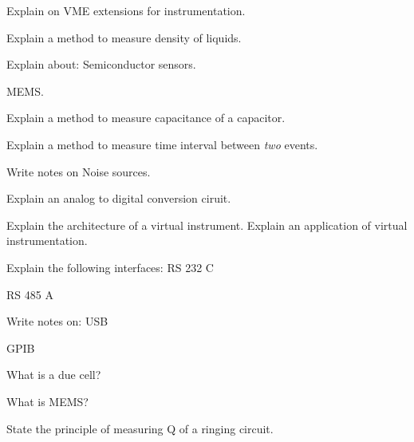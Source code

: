\item Explain on VME extensions for instrumentation.

\markB

\partC

\item \iitem Explain a method to measure density of liquids.

\Or

\item Explain about:
  \iitem Semiconductor sensors.
  \newpage \again
  \item MEMS.
  \ene
\ene

\item \iitem Explain a method to measure capacitance of a 
  capacitor.

\Or

\item Explain a method to measure time interval between
  \emph{two} events.
\ene

\item \iitem \iitem Write notes on Noise sources.
  \item Explain an analog to digital conversion ciruit.
  \ene

\Or

\item Explain the architecture of a virtual instrument.
  Explain an application of virtual instrumentation.
\ene

\item \iitem Explain the following interfaces:
  \iitem RS 232 C
  \item RS 485 A
  \ene

\Or

\item Write notes on:
  \iitem USB
  \item GPIB
  \ene
\ene

\markC

\ene

\newpage




\sub{\subj}

\maxtime


\partA


\iitem What is a due cell?

\item What is MEMS?

\item State the principle of measuring Q of a ringing circuit.

